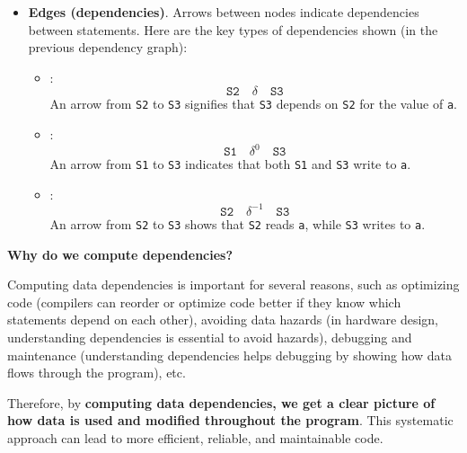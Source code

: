 \begin{itemize}
    \item \textbf{Edges (dependencies)}. Arrows between nodes indicate dependencies between statements. Here are the key types of dependencies shown (in the previous dependency graph):
    \begin{itemize}
        \item {}:
        \begin{equation*}
            \texttt{S2} \hspace{1em} \delta \hspace{1em} \texttt{S3}
        \end{equation*}
        An arrow from \texttt{S2} to \texttt{S3} signifies that \texttt{S3} depends on \texttt{S2} for the value of \texttt{a}.
        \item {}:
        \begin{equation*}
            \texttt{S1} \hspace{1em} \delta^{0} \hspace{1em} \texttt{S3}
        \end{equation*}
        An arrow from \texttt{S1} to \texttt{S3} indicates that both \texttt{S1} and \texttt{S3} write to \texttt{a}.
        \item {}:
        \begin{equation*}
            \texttt{S2} \hspace{1em} \delta^{-1} \hspace{1em} \texttt{S3}
        \end{equation*}
        An arrow from \texttt{S2} to \texttt{S3} shows that \texttt{S2} reads \texttt{a}, while \texttt{S3} writes to \texttt{a}.
    \end{itemize}
\end{itemize}

\highspace
\begin{flushleft}
    \textcolor{Green3}{ \textbf{Why do we compute dependencies?}}
\end{flushleft}
Computing data dependencies is important for several reasons, such as optimizing code (compilers can reorder or optimize code better if they know which statements depend on each other), avoiding data hazards (in hardware design, understanding dependencies is essential to avoid hazards), debugging and maintenance (understanding dependencies helps debugging by showing how data flows through the program), etc.

\highspace
Therefore, by \textbf{computing data dependencies, we get a clear picture of how data is used and modified throughout the program}. This systematic approach can lead to more efficient, reliable, and maintainable code.

